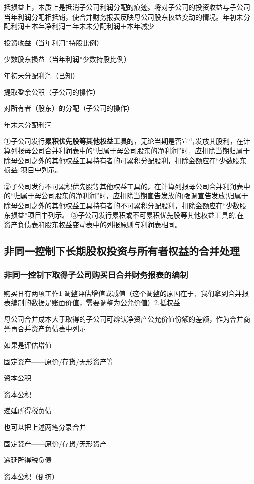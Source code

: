\documentclass[UTF8,12pt]{ctexart}
\newenvironment{Dr}{%
	\begin{list}{}%
		{
			\setlength{\leftmargin}{2em}
			\setlength{\labelwidth}{2em}
			\setlength{\labelsep}{0pt}
			\setlength{\itemindent}{0pt}
			\setlength{\listparindent}{0pt}
			\setlength{\parsep}{0pt}
			\setlength{\topsep}{0pt}
		}
		\item[\textbf{借：}]
	}{%
	\end{list}
}
\newenvironment{Cr}{%
	\begin{list}{}%
		{
			\setlength{\leftmargin}{3em}
			\setlength{\labelwidth}{2em}
			\setlength{\labelsep}{0pt}
			\setlength{\itemindent}{0pt}
			\setlength{\listparindent}{0pt}
			\setlength{\parsep}{0pt}
			\setlength{\topsep}{0pt}
		}
		\item[\textbf{贷：}]
	}{%
	\end{list}
}
\numberwithin{equation}{section} %
\numberwithin{figure}{section}
\numberwithin{table}{section}
\begin{document}
	抵损益上，本质上是抵消子公司利润分配的痕迹。将对子公司的投资收益与子公司当年利润分配相抵销，使合并财务报表反映母公司股东权益变动的情况。年初未分配利润＋本年净利润＝年末未分配利润＋本年减少
	\begin{Dr}
		投资收益（当年利润*持股比例） 
		
		少数股东损益（当年利润*少数持股比例）
		
		年初未分配利润（已知）
	\end{Dr}
	\begin{Cr}
		提取盈余公积（子公司的操作）
		
		对所有者（股东）的分配（子公司的操作）
		
		年末未分配利润
	\end{Cr}
	
	①子公司发行\textbf{累积优先股等其他权益工具}的，无论当期是否宣告发放其股利，在计算列报母公司合并利润表中的“归属于母公司股东的净利润”时，应扣除当期归属于除母公司之外的其他权益工具持有者的可累积分配股利，扣除金额应在“少数股东损益”项目中列示。
	
	②子公司发行不可累积优先股等其他权益工具的，在计算列报母公司合并利润表中的“归属于母公司股东的净利润”时，应扣除当期宣告发放的(强调宣告发放)归属于除母公司之外的其他权益工具持有者的不可累积分配股利，扣除金额应在“少数股东损益”项目中列示。
	③子公司发行累积或不可累积优先股等其他权益工具的,在资产负债表和股东权益变动表中的列报原则与利润表相同。
	
	\subsection{非同一控制下长期股权投资与所有者权益的合并处理}
	
	\subsubsection{非同一控制下取得子公司购买日合并财务报表的编制}
	购买日有两项工作1.调整评估增值或减值（这个调整的原因在于，我们拿到合并报表编制的数据是账面价值，需要调整为公允价值）2.抵权益
	
	母公司合并成本大于取得的子公司可辨认净资产公允价值份额的差额，作为合并商誉再合并资产负债表中列示
	
	如果是评估增值
	\begin{Dr}
		固定资产——原价/存货/无形资产等
	\end{Dr}
	\begin{Cr}
		资本公积
	\end{Cr}
	\begin{Dr}
		资本公积
	\end{Dr}
	\begin{Cr}
		递延所得税负债
	\end{Cr}
	也可以把上述两笔分录合并
	\begin{Dr}
		固定资产——原价/存货/无形资产
	\end{Dr}
	\begin{Cr}
		递延所得税负债
		
		资本公积（倒挤）
	\end{Cr}
	
\end{document}

